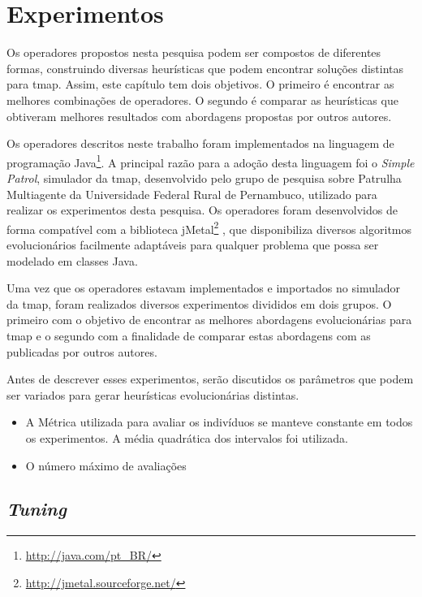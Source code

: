 \chapter{Experimentos}
\label{experimentos}

Os operadores propostos nesta pesquisa podem ser compostos de diferentes formas, 
construindo diversas heurísticas que podem encontrar soluções distintas para 
\ac{tmap}. Assim, este capítulo tem dois objetivos. O primeiro é encontrar as 
melhores combinações de operadores. O segundo é comparar as heurísticas que 
obtiveram melhores resultados com abordagens propostas por outros autores.

Os operadores descritos neste trabalho foram implementados na linguagem de 
programação Java\footnote{\url{http://java.com/pt_BR/}}. A principal razão para 
a adoção desta linguagem foi o \textit{Simple Patrol}, simulador da \ac{tmap}, 
desenvolvido pelo grupo de pesquisa sobre Patrulha Multiagente da Universidade 
Federal Rural de Pernambuco, utilizado para realizar os experimentos desta 
pesquisa. Os operadores foram desenvolvidos de forma compatível com a biblioteca 
jMetal\footnote{\url{http://jmetal.sourceforge.net/}} \citep{Durillo2011}, que 
disponibiliza diversos algoritmos evolucionários facilmente adaptáveis para 
qualquer problema que possa ser modelado em classes Java.

Uma vez que os operadores estavam implementados e importados no simulador da 
\ac{tmap}, foram realizados diversos experimentos divididos em dois grupos. O 
primeiro com o objetivo de encontrar as melhores abordagens evolucionárias para 
\ac{tmap} e o segundo com a finalidade de comparar estas abordagens com as 
publicadas por outros autores.

Antes de descrever esses experimentos, serão discutidos os parâmetros que podem 
ser variados para gerar heurísticas evolucionárias distintas.

\begin{itemize}
	\item A Métrica utilizada para avaliar os indivíduos se manteve constante em 
	todos os experimentos. A média quadrática dos intervalos foi utilizada. 
	\item O número máximo de avaliações
\end{itemize}

\section{\textit{Tuning}}

